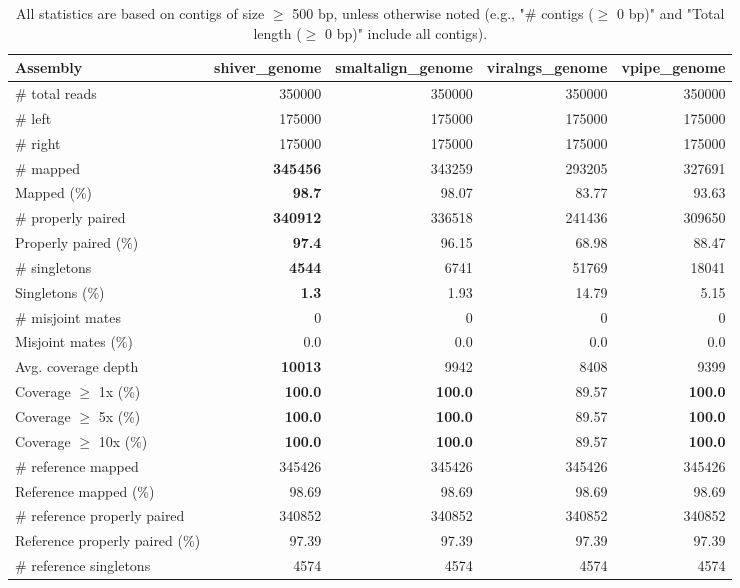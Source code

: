 \documentclass[12pt,a4paper]{article}
\begin{document}
\begin{table}[ht]
\begin{center}
\caption{All statistics are based on contigs of size $\geq$ 500 bp, unless otherwise noted (e.g., "\# contigs ($\geq$ 0 bp)" and "Total length ($\geq$ 0 bp)" include all contigs).}
\begin{tabular}{|l*{4}{|r}|}
\hline
Assembly & shiver\_genome & smaltalign\_genome & viralngs\_genome & vpipe\_genome \\ \hline
\# total reads & 350000 & 350000 & 350000 & 350000 \\ \hline
\# left & 175000 & 175000 & 175000 & 175000 \\ \hline
\# right & 175000 & 175000 & 175000 & 175000 \\ \hline
\# mapped & {\bf 345456} & 343259 & 293205 & 327691 \\ \hline
Mapped (\%) & {\bf 98.7} & 98.07 & 83.77 & 93.63 \\ \hline
\# properly paired & {\bf 340912} & 336518 & 241436 & 309650 \\ \hline
Properly paired (\%) & {\bf 97.4} & 96.15 & 68.98 & 88.47 \\ \hline
\# singletons & {\bf 4544} & 6741 & 51769 & 18041 \\ \hline
Singletons (\%) & {\bf 1.3} & 1.93 & 14.79 & 5.15 \\ \hline
\# misjoint mates & 0 & 0 & 0 & 0 \\ \hline
Misjoint mates (\%) & 0.0 & 0.0 & 0.0 & 0.0 \\ \hline
Avg. coverage depth & {\bf 10013} & 9942 & 8408 & 9399 \\ \hline
Coverage $\geq$ 1x (\%) & {\bf 100.0} & {\bf 100.0} & 89.57 & {\bf 100.0} \\ \hline
Coverage $\geq$ 5x (\%) & {\bf 100.0} & {\bf 100.0} & 89.57 & {\bf 100.0} \\ \hline
Coverage $\geq$ 10x (\%) & {\bf 100.0} & {\bf 100.0} & 89.57 & {\bf 100.0} \\ \hline
\# reference mapped & 345426 & 345426 & 345426 & 345426 \\ \hline
Reference mapped (\%) & 98.69 & 98.69 & 98.69 & 98.69 \\ \hline
\# reference properly paired & 340852 & 340852 & 340852 & 340852 \\ \hline
Reference properly paired (\%) & 97.39 & 97.39 & 97.39 & 97.39 \\ \hline
\# reference singletons & 4574 & 4574 & 4574 & 4574 \\ \hline

\end{tabular}
\end{center}
\end{table}
\end{document}

